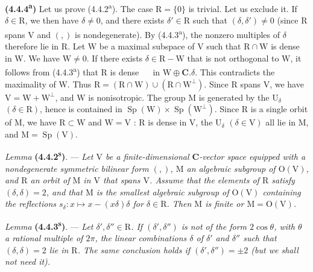 \documentclass[11pt,leqno]{article}
\newcommand{\Page}[1]{\ifvmode\noindent\else\unskip\ \fi{\footnotesize\textcolor{gray}{[p.\,#1]}}\ \ignorespaces}
\begin{document}
\textbf{(4.4.4\textsuperscript{a})} Let us prove (4.4.2\textsuperscript{a}). The case \(\mathrm{R}=\{0\}\) is trivial. Let us exclude it. If \(\delta\in\mathrm{R}\), we then have \(\delta\neq0\), and there exists \(\delta'\in\mathrm{R}\) such that \((\delta,\delta')\neq0\) (since \(\mathrm{R}\) spans \(\mathrm{V}\) and \((,)\) is nondegenerate). By (4.4.3\textsuperscript{a}), the nonzero multiples of \(\delta\) therefore lie in \(\mathrm{R}\). Let \(\mathrm{W}\) be a maximal subspace of \(\mathrm{V}\) such that \(\mathrm{R}\cap\mathrm{W}\)  is dense in \(\mathrm{W}\). We have \(\mathrm{W}\neq0\). If there exists \(\delta\in\mathrm{R}-\mathrm{W}\) that is not orthogonal to \(\mathrm{W}\), it follows from (4.4.3\textsuperscript{a}) that \(\mathrm{R}\) is dense
\Page{228}
in \(\mathrm{W}\oplus\mathbf{C}.\delta\). This contradicts the maximality of \(\mathrm{W}\). Thus \(\mathrm{R}=(\mathrm{R}\cap\mathrm{W})\cup(\mathrm{R}\cap\mathrm{W}^{\perp})\). Since \(\mathrm{R}\) spans \(\mathrm{V}\), we have \(\mathrm{V}=\mathrm{W}+\mathrm{W}^{\perp}\), and \(\mathrm{W}\) is nonisotropic. The group \(\mathrm{M}\) is generated by the \(\mathrm{U}_\delta\) \((\delta\in\mathrm{R})\), hence is contained in \(\operatorname{Sp}(\mathrm{W})\times\operatorname{Sp}(\mathrm{W}^{\perp})\). Since \(\mathrm{R}\) is a single orbit of \(\mathrm{M}\), we have \(\mathrm{R}\subset\mathrm{W}\) and \(\mathrm{W}=\mathrm{V}\) : \(\mathrm{R}\) is dense in \(\mathrm{V}\), the \(\mathrm{U}_\delta\) \((\delta\in\mathrm{V})\) all lie in \(\mathrm{M}\), and \(\mathrm{M}=\operatorname{Sp}(\mathrm{V})\).

\textit{Lemma} \textbf{(4.4.2\textsuperscript{s})}. — \textit{Let \(\mathrm{V}\) be a finite-dimensional \(\mathbf{C}\)-vector space equipped with a nondegenerate symmetric bilinear form \((,)\), \(\mathrm{M}\) an algebraic subgroup of \(\mathrm{O}(\mathrm{V})\), and \(\mathrm{R}\) an orbit of \(\mathrm{M}\) in \(\mathrm{V}\) that spans \(\mathrm{V}\). Assume that the elements of \(\mathrm{R}\) satisfy \((\delta,\delta)=2\), and that \(\mathrm{M}\) is the smallest algebraic subgroup of \(\mathrm{O}(\mathrm{V})\) containing the reflections \(s_\delta:x\mapsto x-(x\delta)\delta\) for \(\delta\in\mathrm{R}\). Then \(\mathrm{M}\) is finite or \(\mathrm{M}=\mathrm{O}(\mathrm{V})\).}

\textit{Lemma} \textbf{(4.4.3\textsuperscript{s})}. — \textit{Let \(\delta',\delta''\in\mathrm{R}\). If \((\delta',\delta'')\) is not of the form \(2\cos\theta\), with \(\theta\) a rational multiple of \(2\pi\), the linear combinations \(\delta\) of \(\delta'\) and \(\delta''\) such that \((\delta,\delta)=2\) lie in \(\mathrm{R}\). The same conclusion holds if \((\delta',\delta'')=\pm2\) (but we shall not need it).}
\end{document}

